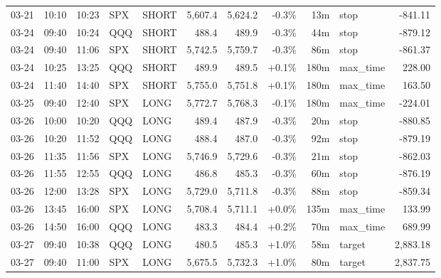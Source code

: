 \documentclass[11pt,a4paper,twoside]{article}
\begin{document}
\begin{center}
\begin{longtable}{>{\color{txtmain}}l l l l l r r r r >{\color{txtmain}}l r}
03-21 & 10:10 & 10:23 & SPX & SHORT & 5,607.4 & 5,624.2 & \textcolor{lossred}{-0.3\%} & 13m & stop & \textcolor{lossred}{-841.11} \\
03-24 & 09:40 & 10:24 & QQQ & SHORT & 488.4 & 489.9 & \textcolor{lossred}{-0.3\%} & 44m & stop & \textcolor{lossred}{-879.12} \\
03-24 & 09:40 & 11:06 & SPX & SHORT & 5,742.5 & 5,759.7 & \textcolor{lossred}{-0.3\%} & 86m & stop & \textcolor{lossred}{-861.37} \\
03-24 & 10:25 & 13:25 & QQQ & SHORT & 489.9 & 489.5 & \textcolor{wingreen}{+0.1\%} & 180m & max\_time & \textcolor{wingreen}{228.00} \\
03-24 & 11:40 & 14:40 & SPX & SHORT & 5,755.0 & 5,751.8 & \textcolor{wingreen}{+0.1\%} & 180m & max\_time & \textcolor{wingreen}{163.50} \\
03-25 & 09:40 & 12:40 & SPX & LONG & 5,772.7 & 5,768.3 & \textcolor{lossred}{-0.1\%} & 180m & max\_time & \textcolor{lossred}{-224.01} \\
03-26 & 10:00 & 10:20 & QQQ & LONG & 489.4 & 487.9 & \textcolor{lossred}{-0.3\%} & 20m & stop & \textcolor{lossred}{-880.85} \\
03-26 & 10:20 & 11:52 & QQQ & LONG & 488.4 & 487.0 & \textcolor{lossred}{-0.3\%} & 92m & stop & \textcolor{lossred}{-879.19} \\
03-26 & 11:35 & 11:56 & SPX & LONG & 5,746.9 & 5,729.6 & \textcolor{lossred}{-0.3\%} & 21m & stop & \textcolor{lossred}{-862.03} \\
03-26 & 11:55 & 12:55 & QQQ & LONG & 486.8 & 485.3 & \textcolor{lossred}{-0.3\%} & 60m & stop & \textcolor{lossred}{-876.19} \\
03-26 & 12:00 & 13:28 & SPX & LONG & 5,729.0 & 5,711.8 & \textcolor{lossred}{-0.3\%} & 88m & stop & \textcolor{lossred}{-859.34} \\
03-26 & 13:45 & 16:00 & SPX & LONG & 5,708.4 & 5,711.1 & \textcolor{wingreen}{+0.0\%} & 135m & max\_time & \textcolor{wingreen}{133.99} \\
03-26 & 14:50 & 16:00 & QQQ & LONG & 483.3 & 484.4 & \textcolor{wingreen}{+0.2\%} & 70m & max\_time & \textcolor{wingreen}{689.99} \\
03-27 & 09:40 & 10:38 & QQQ & LONG & 480.5 & 485.3 & \textcolor{wingreen}{+1.0\%} & 58m & target & \textcolor{wingreen}{2,883.18} \\
03-27 & 09:40 & 11:00 & SPX & LONG & 5,675.5 & 5,732.3 & \textcolor{wingreen}{+1.0\%} & 80m & target & \textcolor{wingreen}{2,837.75} \\

\end{longtable}
\end{center}
\end{document}

